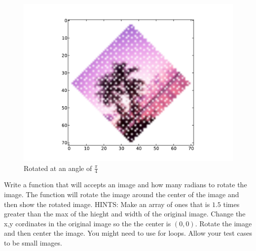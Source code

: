 \begin{figure}[H]
\includegraphics[scale = .5]{rotateimg}
\caption{Rotated at an angle of $\frac{\pi}{4}$}
\end{figure}

\begin{problem}
Write a function that will accepts an image and how many radians to rotate the image. The function will rotate the image around the center of the image and then show the rotated image. HINTS: Make an array of ones that is $1.5$ times greater than the max of the hieght and width of the original image. Change the x,y cordinates in the original image so the the center is $(0,0)$. Rotate the image and then center the image. You might need to use for loops. Allow your test cases to be small images.
\end{problem}


